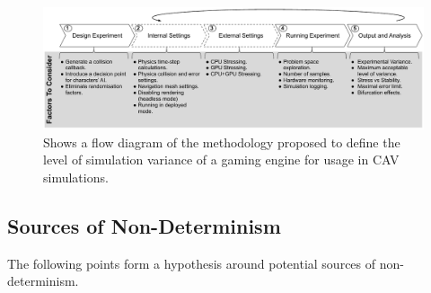 

\begin{figure}[b]
    \centering
    \includegraphics[width=0.99\linewidth]{Other/Figures/MethodologyDiagram.pdf}
    \caption{Shows a flow diagram of the methodology proposed to define the level of simulation variance of a gaming engine for usage in CAV simulations.}

    \label{method_diagram}
\end{figure}

\subsection{Sources of Non-Determinism} \label{s:nondeterminisimSources}

The following points form a hypothesis around potential sources of non-determinism.

